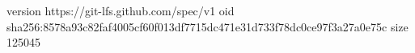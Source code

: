 version https://git-lfs.github.com/spec/v1
oid sha256:8578a93c82faf4005cf60f013df7715dc471e31d733f78dc0ce97f3a27a0e75c
size 125045
